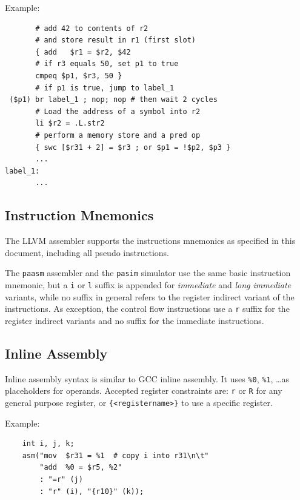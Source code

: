 \documentclass[a4paper,fontsize=10pt,twoside,DIV15,BCOR12mm,headinclude=true,footinclude=false,pagesize,bibtotoc]{scrbook}
\newcommand{\comment}[3]{

\textsf{\textbf{#1}} {\color{#3}#2}}
\newcommand{\stefan}[1]{\comment{Stefan}{#1}{RoyalPurple}}
\renewcommand{\stefan}[1]{}
\begin{document}
Example:
\begin{verbatim}
       # add 42 to contents of r2
       # and store result in r1 (first slot)
       { add   $r1 = $r2, $42
       # if r3 equals 50, set p1 to true
       cmpeq $p1, $r3, 50 }
       # if p1 is true, jump to label_1
 ($p1) br label_1 ; nop; nop # then wait 2 cycles
       # Load the address of a symbol into r2
       li $r2 = .L.str2
       # perform a memory store and a pred op
       { swc [$r31 + 2] = $r3 ; or $p1 = !$p2, $p3 }
       ...
label_1:
       ...
\end{verbatim}

\stefan{TODO: some words about units of .align, .size, ..; describe .fstart;
I would like to move the assembly format description out into a public repo (patmos-misc) and merge
it with a compiler usage manual, ELF file format and backend description, though.}

\subsection{Instruction Mnemonics}

The LLVM assembler supports the instructions mnemonics as specified in this document, including all pseudo instructions.

The \texttt{paasm} assembler and the \texttt{pasim} simulator use the same basic instruction mnemonic, but a \texttt{i} or
\texttt{l} suffix is appended for \emph{immediate} and \emph{long immediate} variants, while no suffix in general refers to
the register indirect variant of the instructions. As exception, the control flow instructions use a \texttt{r} suffix for the register
indirect variants and no suffix for the immediate instructions.
\stefan{This should be cleaned up, always use \texttt{i} suffix for immediates in pasim/paasm, including control flow.}

\subsection{Inline Assembly}

Inline assembly syntax is similar to GCC inline assembly. It uses \texttt{\%0}, \texttt{\%1}, \dots as placeholders
for operands. Accepted register constraints are: \texttt{r} or \texttt{R} for any general purpose register, or
\texttt{\{<registername>\}} to use a specific register.

Example:
\begin{lstlisting}
    int i, j, k;
    asm("mov  $r31 = %1  # copy i into r31\n\t"
        "add  %0 = $r5, %2"
        : "=r" (j)
        : "r" (i), "{r10}" (k));
\end{lstlisting}
\end{document}
